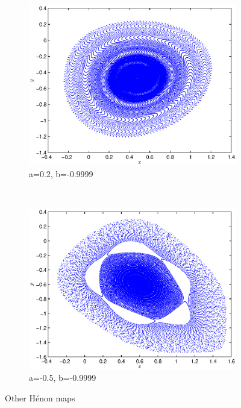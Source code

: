 \documentclass[a4paper]{article}
\begin{document}
\begin{figure}[h]
    \centering
    \begin{subfigure}[b]{0.45\textwidth}
        \includegraphics[width=\textwidth]{henon1}
        \caption{a=0.2, b=-0.9999}
        \label{fig:tiger}
    \end{subfigure}
    ~ %
    \begin{subfigure}[b]{0.45\textwidth}
        \includegraphics[width=\textwidth]{henon2}
        \caption{a=-0.5, b=-0.9999}
        \label{fig:mouse}
    \end{subfigure}
    \caption{Other H{\'e}non maps}\label{fig:animals}
\end{figure} 
\end{document}
